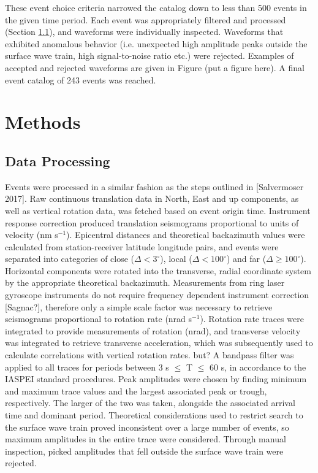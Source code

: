 \documentclass{gji}
\begin{document}
These event choice criteria narrowed the catalog down to less than 500 events in the given time period. Each event was appropriately filtered and processed (Section \ref{sec:dataproc}), and waveforms were individually inspected. Waveforms that exhibited anomalous behavior (i.e. unexpected high amplitude peaks outside the surface wave train, high signal-to-noise ratio etc.) were rejected. Examples of accepted and rejected waveforms are given in Figure (put a figure here). A final event catalog of 243 events was reached.

\section{Methods}
\subsection{Data Processing}\label{sec:dataproc}
Events were processed in a similar fashion as the steps outlined in [Salvermoser 2017]. %
Raw continuous translation data in North, East and up components, as well as vertical rotation data, was fetched based on event origin time. Instrument response correction produced translation seismograms proportional to units of velocity (nm s$^{-1}$). Epicentral distances and theoretical backazimuth values were calculated from station-receiver latitude longitude pairs, and events were separated into categories of close ($\Delta < 3^\circ$), local ($\Delta <100^\circ$) and far ($\Delta \ge 100^\circ$). Horizontal components were rotated into the transverse, radial coordinate system by the appropriate theoretical backazimuth. Measurements from ring laser gyroscope instruments do not require frequency dependent instrument correction [Sagnac?], %
therefore only a simple scale factor was necessary to retrieve seismograms proportional to rotation rate (nrad s$^{-1}$). Rotation rate traces were integrated to provide measurements of rotation (nrad), and transverse velocity was integrated to retrieve transverse acceleration, which was subsequently used to calculate correlations with vertical rotation rates.
but?
A bandpass filter was applied to all traces for periods between 3 s $\le$ T $\le$ 60 s, in accordance to the IASPEI standard procedures. Peak amplitudes were chosen by finding minimum and maximum trace values and the largest associated peak or trough, respectively. The larger of the two was taken, alongside the associated arrival time and dominant period. %
Theoretical considerations used to restrict search to the surface wave train proved inconsistent over a large number of events, so maximum amplitudes in the entire trace were considered. Through manual inspection, picked amplitudes that fell outside the surface wave train were rejected. %
\end{document}

